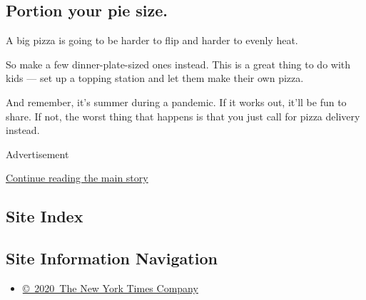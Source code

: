 \hypertarget{portion-your-pie-size}{%
\subsection{Portion your pie size.}\label{portion-your-pie-size}}

A big pizza is going to be harder to flip and harder to evenly heat.

So make a few dinner-plate-sized ones instead. This is a great thing to
do with kids --- set up a topping station and let them make their own
pizza.

And remember, it's summer during a pandemic. If it works out, it'll be
fun to share. If not, the worst thing that happens is that you just call
for pizza delivery instead.

Advertisement

\protect\hyperlink{after-bottom}{Continue reading the main story}

\hypertarget{site-index}{%
\subsection{Site Index}\label{site-index}}

\hypertarget{site-information-navigation}{%
\subsection{Site Information
Navigation}\label{site-information-navigation}}

\begin{itemize}
\tightlist
\item
  \href{https://help.nytimes3xbfgragh.onion/hc/en-us/articles/115014792127-Copyright-notice}{©~2020~The
  New York Times Company}
\end{itemize}

